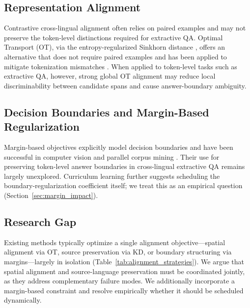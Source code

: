 \documentclass[11pt]{article}
\begin{document}
\subsection{Representation Alignment}
Contrastive cross-lingual alignment often relies on paired examples \citep{chi-etal-2021-infoxlm} and may not preserve the token-level distinctions required for extractive QA. Optimal Transport (OT), via the entropy-regularized Sinkhorn distance \citep{2999792.2999868}, offers an alternative that does not require paired examples and has been applied to mitigate tokenization mismatches \citep{sherborne-etal-2023-optimal}. When applied to token-level tasks such as extractive QA, however, strong global OT alignment may reduce local discriminability between candidate spans and cause answer-boundary ambiguity.

\subsection{Decision Boundaries and Margin-Based Regularization}
Margin-based objectives explicitly model decision boundaries and have been successful in computer vision \citep{8100196, 8578650, Deng_2022} and parallel corpus mining \citep{artetxe-schwenk-2019-margin}. Their use for preserving token-level answer boundaries in cross-lingual extractive QA remains largely unexplored. Curriculum learning \citep{10.1145/1553374.1553380} further suggests scheduling the boundary-regularization coefficient itself; we treat this as an empirical question (Section~\ref{sec:margin_impact}).

\subsection{Research Gap}
Existing methods typically optimize a single alignment objective—spatial alignment via OT, source preservation via KD, or boundary structuring via margins—largely in isolation (Table~\ref{tab:alignment_strategies}). We argue that spatial alignment and source-language preservation must be coordinated jointly, as they address complementary failure modes. We additionally incorporate a margin-based constraint and resolve empirically whether it should be scheduled dynamically.
\end{document}
